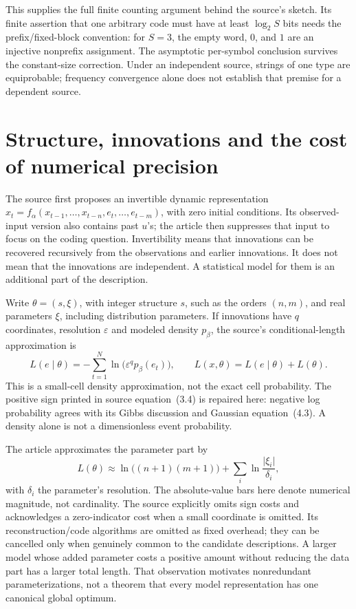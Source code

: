 This supplies the full finite counting argument behind the source's sketch.
Its finite assertion that one arbitrary code must have at least
\(\log_2S\) bits needs the prefix/fixed-block convention: for \(S=3\),
the empty word, \(0\), and \(1\) are an injective nonprefix assignment.
The asymptotic per-symbol conclusion survives the constant-size correction.
Under an independent source, strings of one type are equiprobable; frequency
convergence alone does not establish that premise for a dependent source.

\section{Structure, innovations and the cost of numerical precision}
\label{sec:p15-rmdl-structure}

The source first proposes an invertible dynamic representation
\(x_t=f_\alpha(x_{t-1},\ldots,x_{t-n},e_t,\ldots,e_{t-m})\),
with zero initial conditions. Its observed-input version also contains
past \(u\)'s; the article then suppresses that input to focus on the
coding question. Invertibility means that innovations can be recovered
recursively from the observations and earlier innovations. It does not
mean that the innovations are independent. A statistical model for them
is an additional part of the description.

Write \(\theta=(s,\xi)\), with integer structure \(s\), such as the
orders \((n,m)\), and real parameters \(\xi\), including distribution
parameters. If innovations have \(q\) coordinates, resolution
\(\varepsilon\) and modeled density \(p_\beta\), the source's
conditional-length approximation is
\[
 L(e\mid\theta)=-\sum_{t=1}^N\ln\bigl(\varepsilon^q p_\beta(e_t)\bigr),
 \qquad L(x,\theta)=L(e\mid\theta)+L(\theta).
\]
This is a small-cell density approximation, not the exact cell probability.
The positive sign printed in source equation~(3.4) is repaired here:
negative log probability agrees with its Gibbs discussion and Gaussian
equation~(4.3). A density alone is not a dimensionless event probability.

The article approximates the parameter part by
\[
 L(\theta)\approx\ln\bigl((n+1)(m+1)\bigr)
                  +\sum_i\ln\frac{\lvert\xi_i\rvert}{\delta_i},
\]
with \(\delta_i\) the parameter's resolution. The absolute-value bars
here denote numerical magnitude, not cardinality. The source explicitly
omits sign costs and acknowledges a zero-indicator cost when a small
coordinate is omitted. Its reconstruction/code algorithms are omitted as
fixed overhead; they can be cancelled only when genuinely common to the
candidate descriptions. A larger model whose added parameter costs a
positive amount without reducing the data part has a larger total length.
That observation motivates nonredundant parameterizations, not a theorem
that every model representation has one canonical global optimum.

